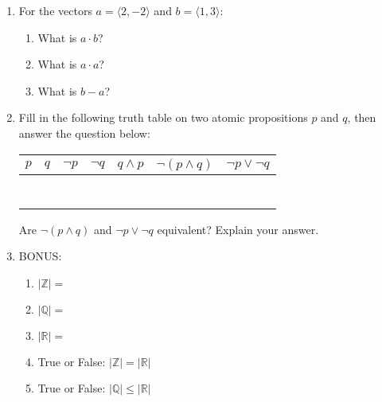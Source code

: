 \documentclass[11pt, oneside]{article}   	%
\newcommand{\reals}{\mathbb{R}}
\newcommand{\ints}{\mathbb{Z}}
\begin{document}
\begin{enumerate}
\clearpage
\item For the vectors $a=\langle2,-2\rangle$ and $b=\langle 1,3 \rangle$:
\begin{enumerate}
\item What is $a\cdot b$? \vspace{2em}
\item What is $a\cdot a$? \vspace{2em}
\item What is $b-a$? \vspace{2em}
\end{enumerate}

\item Fill in the following truth table on two atomic propositions $p$ and $q$, then answer the question below:\\
\begin{center}
\begin{tabular}{c|c||c|c|c|c|c}
$p$ & $q$ & $\neg p$ & $\neg q$ & $q \wedge p$ & $\neg (p \wedge q)$ & $\neg p \vee \neg q$\\
\hline
\hline
\hspace*{2em}& \hspace{2em} & \hspace{2em} & \hspace{2em} & \hspace{2em} & \hspace{2em} & \hspace{2em} \\
& & & & & &\\& & & & & &\\& & & & & &\\& & & & & &\\& & & & & &\\& & & & & &\\
\end{tabular}
\end{center}

Are $\neg (p \wedge q)$ and $\neg p \vee \neg q$ equivalent? Explain your answer.\vspace{4em}

\item BONUS: 
\begin{enumerate}
\item $|\ints|=$
\item $|\mathbb{Q}|=$
\item $|\reals|=$
\item True or False: $|\ints| = |\reals|$
\item True or False: $|\mathbb{Q}| \le |\reals|$
\end{enumerate}

\end{enumerate}
\end{document}
